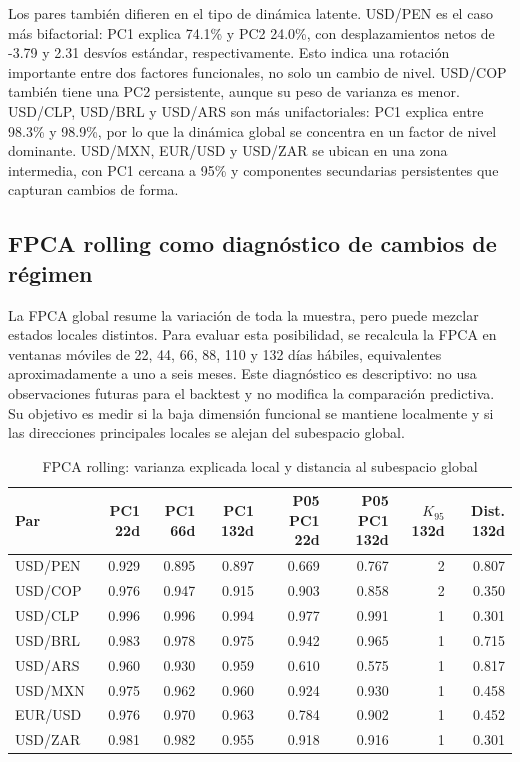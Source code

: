 \documentclass[a4paper,11pt]{article}
\begin{document}
Los pares también difieren en el tipo de dinámica latente. USD/PEN es el caso más bifactorial: PC1 explica 74.1\% y PC2 24.0\%, con desplazamientos netos de -3.79 y 2.31 desvíos estándar, respectivamente. Esto indica una rotación importante entre dos factores funcionales, no solo un cambio de nivel. USD/COP también tiene una PC2 persistente, aunque su peso de varianza es menor. USD/CLP, USD/BRL y USD/ARS son más unifactoriales: PC1 explica entre 98.3\% y 98.9\%, por lo que la dinámica global se concentra en un factor de nivel dominante. USD/MXN, EUR/USD y USD/ZAR se ubican en una zona intermedia, con PC1 cercana a 95\% y componentes secundarias persistentes que capturan cambios de forma.

\subsection{FPCA rolling como diagnóstico de cambios de régimen}

La FPCA global resume la variación de toda la muestra, pero puede mezclar estados locales distintos. Para evaluar esta posibilidad, se recalcula la FPCA en ventanas móviles de 22, 44, 66, 88, 110 y 132 días hábiles, equivalentes aproximadamente a uno a seis meses. Este diagnóstico es descriptivo: no usa observaciones futuras para el backtest y no modifica la comparación predictiva. Su objetivo es medir si la baja dimensión funcional se mantiene localmente y si las direcciones principales locales se alejan del subespacio global.

\begin{table}[H]
\centering
\caption{FPCA rolling: varianza explicada local y distancia al subespacio global}
\label{tab:rolling_fpca}
\scriptsize
\begin{tabular}{lrrrrrrr}
\toprule
Par & PC1 22d & PC1 66d & PC1 132d & P05 PC1 22d & P05 PC1 132d & \(K_{95}\) 132d & Dist. 132d \\
\midrule
USD/PEN & 0.929 & 0.895 & 0.897 & 0.669 & 0.767 & 2 & 0.807 \\
USD/COP & 0.976 & 0.947 & 0.915 & 0.903 & 0.858 & 2 & 0.350 \\
USD/CLP & 0.996 & 0.996 & 0.994 & 0.977 & 0.991 & 1 & 0.301 \\
USD/BRL & 0.983 & 0.978 & 0.975 & 0.942 & 0.965 & 1 & 0.715 \\
USD/ARS & 0.960 & 0.930 & 0.959 & 0.610 & 0.575 & 1 & 0.817 \\
USD/MXN & 0.975 & 0.962 & 0.960 & 0.924 & 0.930 & 1 & 0.458 \\
EUR/USD & 0.976 & 0.970 & 0.963 & 0.784 & 0.902 & 1 & 0.452 \\
USD/ZAR & 0.981 & 0.982 & 0.955 & 0.918 & 0.916 & 1 & 0.301 \\
\bottomrule
\end{tabular}
\end{table}
\end{document}
